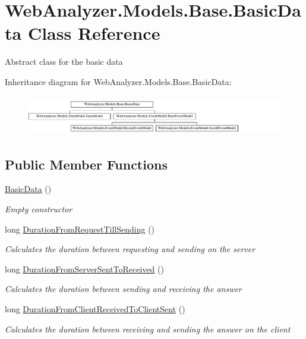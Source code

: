 \hypertarget{class_web_analyzer_1_1_models_1_1_base_1_1_basic_data}{}\section{Web\+Analyzer.\+Models.\+Base.\+Basic\+Data Class Reference}
\label{class_web_analyzer_1_1_models_1_1_base_1_1_basic_data}


Abstract class for the basic data  


Inheritance diagram for Web\+Analyzer.\+Models.\+Base.\+Basic\+Data\+:\begin{figure}[H]
\begin{center}
\leavevmode
\includegraphics[height=1.750000cm]{class_web_analyzer_1_1_models_1_1_base_1_1_basic_data}
\end{center}
\end{figure}
\subsection*{Public Member Functions}
\begin{DoxyCompactItemize}
\item 
\hyperlink{class_web_analyzer_1_1_models_1_1_base_1_1_basic_data_a2c930c0d9a1da4147a2845a595fa25f0}{Basic\+Data} ()
\begin{DoxyCompactList}\small\item\em Empty constructor \end{DoxyCompactList}\item 
long \hyperlink{class_web_analyzer_1_1_models_1_1_base_1_1_basic_data_abfc630907e2b10eee7bae486ae2f21a4}{Duration\+From\+Request\+Till\+Sending} ()
\begin{DoxyCompactList}\small\item\em Calculates the duration between requesting and sending on the server \end{DoxyCompactList}\item 
long \hyperlink{class_web_analyzer_1_1_models_1_1_base_1_1_basic_data_a441d5a37fec9147bb16831aae4d957e2}{Duration\+From\+Server\+Sent\+To\+Received} ()
\begin{DoxyCompactList}\small\item\em Calculates the duration between sending and receiving the answer \end{DoxyCompactList}\item 
long \hyperlink{class_web_analyzer_1_1_models_1_1_base_1_1_basic_data_a438bf9b94d6048ed88a268f0497f4ee0}{Duration\+From\+Client\+Received\+To\+Client\+Sent} ()
\begin{DoxyCompactList}\small\item\em Calculates the duration between receiving and sending the answer on the client \end{DoxyCompactList}\end{DoxyCompactItemize}

